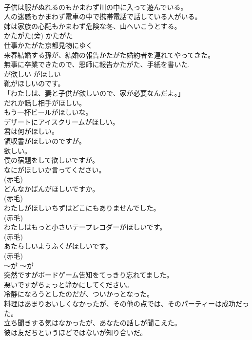 \documentclass[8pt]{extreport}
\begin{document}
\begin{CJK}{UTF8}{min}
\\	子供は服がぬれるのもかまわず川の中に入って遊んでいる。  
\\	人の迷惑もかまわず電車の中で携帯電話で話している人がいる。  
\\	姉は家族の心配もかまわず危険な冬、山へいこうとする。  
\\	かたがた(旁)	かたがた	
\\	仕事かたがた京都見物にゆく  
\\	来春結婚する孫が、結婚の報告かたがた婚約者を連れてやってきた。  
\\	無事に卒業できたので、恩師に報告かたがた、手紙を書いた.  
\\	が欲しい	がほしい	
\\	靴がほしいのです。  
\\	「わたしは、妻と子供が欲しいので、家が必要なんだよ。」  
\\	だれか話し相手がほしい。  
\\	もう一杯ビールがほしいな。  
\\	デザートにアイスクリームがほしい。  
\\	君は何がほしい。  
\\	領収書がほしいのですが。  
\\	欲しい。  
\\	僕の宿題をして欲しいですが。  
\\	なにがほしいか言ってください。  
\\	(赤毛)
\\	どんなかばんがほしいですか。  
\\	(赤毛)
\\	わたしがほしいちずはどこにもありませんでした。  
\\	(赤毛)
\\	わたしはもっと小さいテープレコダーがほしいです。  
\\	(赤毛)
\\	あたらしいようふくがほしいです。  
\\	(赤毛)
\\	〜が	〜が	
\\	突然ですがボードゲーム告知をてっきり忘れてました。
\\	悪いですがちょっと静かにしてください。
\\	冷静になろうとしたのだが、ついかっとなった。  
\\	料理はあまりおいしくなかったが、その他の点では、そのパーティーは成功だった。  
\\	立ち聞きする気はなかったが、あなたの話しが聞こえた。  
\\	彼は友だちというほどではないが知り合いだ。  

\end{CJK}
\end{document}
